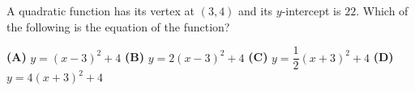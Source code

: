 A quadratic function has its vertex at $(3,4)$ and its $y$-intercept is $22$. Which of the following is the equation of the function?

\textbf{(A)} $y=(x-3)^2+4$ \qquad \textbf{(B)} $y=2(x-3)^2+4$ \qquad \textbf{(C)} $y=\dfrac{1}{2}(x+3)^2+4$ \qquad \textbf{(D)} $y=4(x+3)^2+4$
